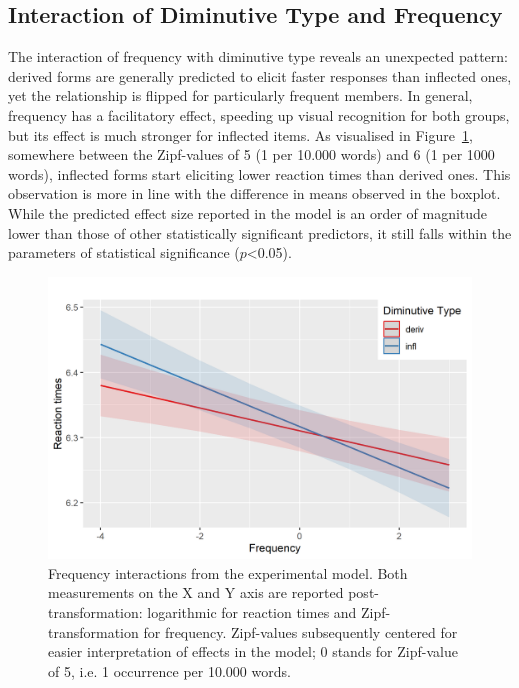 \subsection{Interaction of Diminutive Type and Frequency} \label{subsec:interaction}
The interaction of frequency with diminutive type reveals an unexpected pattern: derived forms are generally predicted to elicit faster responses than inflected ones, yet the relationship is flipped for particularly frequent members. In general, frequency has a facilitatory effect, speeding up visual recognition for both groups, but its effect is much stronger for inflected items. As visualised in Figure~\ref{fig:interaction}, somewhere between the Zipf-values of 5 (1 per 10.000 words) and 6 (1 per 1000 words), inflected forms start eliciting lower reaction times than derived ones. This observation is more in line with the difference in means observed in the boxplot. While the predicted effect size reported in the model is an order of magnitude lower than those of other statistically significant predictors, it still falls within the parameters of statistical significance ($p$<0.05).
\begin{figure}[ht]
    \centering
    \includegraphics[width=\textwidth]{images/mod_int.png}
    \caption[Frequency interactions from the experimental model]{Frequency interactions from the experimental model. Both measurements on the X and Y axis are reported post-transformation: logarithmic for reaction times and Zipf-transformation for frequency. Zipf-values subsequently centered for easier interpretation of effects in the model; 0 stands for Zipf-value of 5, i.e. 1 occurrence per 10.000 words.}
    \label{fig:interaction}
\end{figure}
